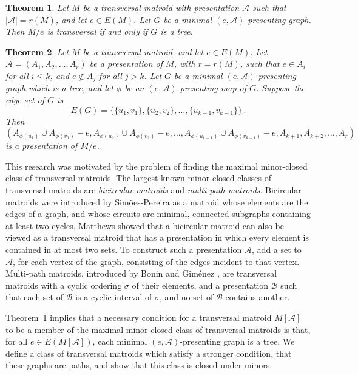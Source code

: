 \documentclass[11pt, reqno]{amsart}
\newtheorem{theorem}{Theorem} [section]
\begin{document}
\begin{theorem} \label{thm: contraction}
Let $M$ be a transversal matroid with presentation $\mathcal A$ such that $|\mathcal A| = r(M)$, and let $e \in E(M)$. Let $G$ be a minimal $(e, \mathcal A)$-presenting graph. Then $M / e$ is transversal if and only if $G$ is a tree.
\end{theorem}

\begin{theorem} \label{thm: construction}
Let $M$ be a transversal matroid, and let $e \in E(M)$. Let $\mathcal A = (A_1,A_2,\ldots,A_r)$ be a presentation of $M$, with $r = r(M)$, such that $e \in A_i$ for all $i \leq k$, and $e \notin A_j$ for all $j > k$. Let $G$ be a minimal $(e, \mathcal A)$-presenting graph which is a tree, and let $\phi$ be an $(e, \mathcal A)$-presenting map of $G$. Suppose the edge set of $G$ is
$$
E(G) = \{\{u_1,v_1\},\{u_2,v_2\},\ldots,\{u_{k-1},v_{k-1}\}\} \,.
$$
Then
$$
(A_{\phi(u_1)} \cup A_{\phi(v_1)} - e, A_{\phi(u_2)} \cup A_{\phi(v_2)} - e, \ldots, A_{\phi(u_{k-1})} \cup A_{\phi(v_{k-1})} - e, A_{k+1}, A_{k+2}, \ldots, A_r)
$$
is a presentation of $M / e$.
\end{theorem}

This research was motivated by the problem of finding the maximal minor-closed class of transversal matroids. The largest known minor-closed classes of transversal matroids are \emph{bicircular matroids} and \emph{multi-path matroids}. Bicircular matroids were introduced by Sim\~oes-Pereira \cite{sim72} as a matroid whose elements are the edges of a graph, and whose circuits are minimal, connected subgraphs containing at least two cycles. Matthews \cite{mat77} showed that a bicircular matroid can also be viewed as a transversal matroid that has a presentation in which every element is contained in at most two sets. To construct such a presentation $\mathcal A$, add a set to $\mathcal A$, for each vertex of the graph, consisting of the edges incident to that vertex. Multi-path matroids, introduced by Bonin and Gim\'enez \cite{bon07}, are transversal matroids with a cyclic ordering $\sigma$ of their elements, and a presentation $\mathcal B$ such that each set of $\mathcal B$ is a cyclic interval of $\sigma$, and no set of $\mathcal B$ contains another.

Theorem~\ref{thm: contraction} implies that a necessary condition for a transversal matroid $M[\mathcal A]$ to be a member of the maximal minor-closed class of transversal matroids is that, for all $e \in E(M[\mathcal A])$, each minimal $(e, \mathcal A)$-presenting graph is a tree. We define a class of transversal matroids which satisfy a stronger condition, that these graphs are paths, and show that this class is closed under minors.
\end{document}
